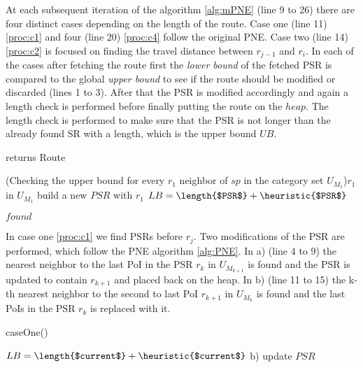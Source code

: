 At each subsequent iteration of the algorithm \ref{alg:mPNE} (line 9 to 26) there are four distinct cases depending on the length of the route. Case one (line 11) \ref{proc:c1} and four (line 20) \ref{proc:c4} follow the original PNE. Case two (line 14) \ref{proc:c2} is focused on finding the travel distance between $r_{j-1}$ and $r_i$. In each of the cases after fetching the route first the \textit{lower bound} of the fetched PSR is compared to the global \textit{upper bound} to see if the route should be modified or discarded (lines 1 to 3). After that the PSR is modified accordingly and again a length check is performed before finally putting the route on the $heap$. The length check is performed to make sure that the PSR is not longer than the already found SR with a length, which is the upper bound $UB$.  

\begin{algorithm}[htb!]
	\label{alg:mPNE}
	\caption{\protect\modifiedPNE returns Route}
	
	\ForEach(Checking the upper bound for every $r_1$ neighbor of $sp$ in the category set $U_{M_1}$){$r_1$ in $U_{M_1}$}{
		build a new $PSR$ with $r_1$\;
		$LB = \length{$PSR$} + \heuristic{$PSR$}$\;
	}
	
	
	\Return $found$
	
\end{algorithm}

In case one \ref{proc:c1} we find PSRs before $r_j$. Two modifications of the PSR are performed, which follow the PNE algorithm \ref{alg:PNE}. In a) (line 4 to 9) the nearest neighbor to the last PoI in the PSR $r_k$ in $U_{M_{k+1}}$ is found and the PSR is updated to contain $r_{k+1}$ and placed back on the heap. In b) (line 11 to 15) the k-th nearest neighbor to the second to last PoI $r_{k+1}$ in $U_{M_{k}}$ is found and the last PoIs in the PSR $r_k$ is replaced with it. \newline

\raggedbottom

\begin{procedure}[H]
	\label{proc:c1}
	\caption{caseOne()}
	
	$LB = \length{$current$} + \heuristic{$current$}$\;
	b) \;
	update $PSR$\;
\end{procedure}

